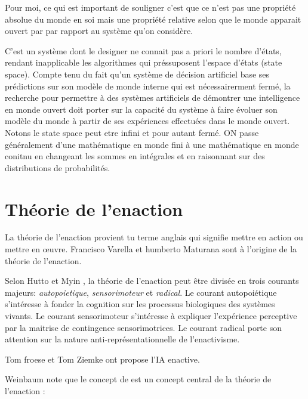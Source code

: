 Pour moi, ce qui est important de souligner c'est que ce n'est pas une propriété absolue du monde en soi mais une propriété relative selon que le monde apparait ouvert par par rapport au système qu'on considère. 

C'est un système dont le designer ne connait pas a priori le nombre d'états, rendant inapplicable les algorithmes qui préssuposent l'espace d'états (state space). 
Compte tenu du fait qu'un système de décision artificiel base ses prédictions sur son modèle de monde interne qui est nécessairerment fermé, la recherche pour permettre à des systèmes artificiels de démontrer une intelligence en monde ouvert doit porter sur la capacité du système à faire évoluer son modèle du monde à partir de ses expériences effectuées dans le monde ouvert. 
Notons le state space peut etre infini et pour autant fermé. 
ON passe généralement d'une mathématique en monde fini à une mathématique en monde conitnu en changeant les sommes en intégrales et en raisonnant sur des distributions de probabilités. 




\section{Théorie de l'enaction}

La théorie de l'enaction provient tu terme anglais  qui signifie mettre en action ou mettre en œuvre. 
Francisco Varella et humberto Maturana \cite{varela_embodied_1993} sont à l'origine de la théorie de l'enaction.



Selon Hutto et Myin \cite{hutto_radicalizing_2013}, la théorie de l'enaction peut être divisée en trois courants majeurs: \emph{autopoietique}, \emph{sensorimoteur} et \emph{radical}. 
Le courant autopoiétique \cite{varela_embodied_1993} s'intéresse à fonder la cognition sur les processus biologiques des systèmes vivants. 
Le courant sensorimoteur \cite{oregan_sensorimotor_2001} s'intéresse à expliquer l'expérience perceptive par la maitrise de contingence sensorimotrices. 
Le courant radical \cite{hutto_radicalizing_2013} porte son attention sur la nature anti-représentationnelle de l'enactivisme. 
 

Tom froese et Tom Ziemke ont propose l'IA enactive. 
\cite{froese_enactive_2009}

Weinbaum note que le concept de  est un concept central de la théorie de l'enaction \cite{weinbaum_open_2015}: 

